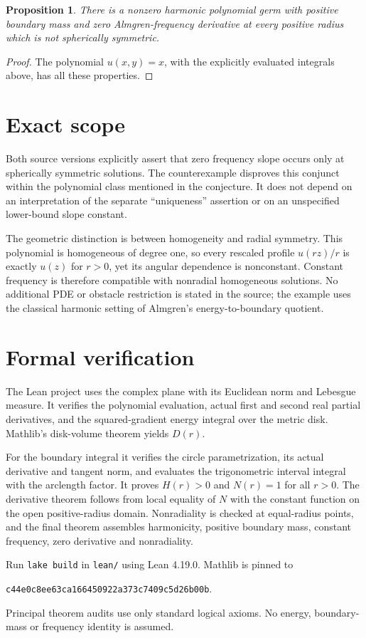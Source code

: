\documentclass[11pt]{article}
\newtheorem{proposition}{Proposition}
\begin{document}
\begin{proposition}
There is a nonzero harmonic polynomial germ with positive boundary mass and zero Almgren-frequency derivative at every positive radius which is not spherically symmetric.
\end{proposition}
\begin{proof}
The polynomial $u(x,y)=x$, with the explicitly evaluated integrals above, has all these properties.
\end{proof}

\section*{Exact scope}
Both source versions explicitly assert that zero frequency slope occurs only at spherically symmetric solutions. The counterexample disproves this conjunct within the polynomial class mentioned in the conjecture. It does not depend on an interpretation of the separate ``uniqueness'' assertion or on an unspecified lower-bound slope constant.

The geometric distinction is between homogeneity and radial symmetry. This polynomial is homogeneous of degree one, so every rescaled profile $u(rz)/r$ is exactly $u(z)$ for $r>0$, yet its angular dependence is nonconstant. Constant frequency is therefore compatible with nonradial homogeneous solutions. No additional PDE or obstacle restriction is stated in the source; the example uses the classical harmonic setting of Almgren's energy-to-boundary quotient.

\section*{Formal verification}
The Lean project uses the complex plane with its Euclidean norm and Lebesgue measure. It verifies the polynomial evaluation, actual first and second real partial derivatives, and the squared-gradient energy integral over the metric disk. Mathlib's disk-volume theorem yields $D(r)$.

For the boundary integral it verifies the circle parametrization, its actual derivative and tangent norm, and evaluates the trigonometric interval integral with the arclength factor. It proves $H(r)>0$ and $N(r)=1$ for all $r>0$. The derivative theorem follows from local equality of $N$ with the constant function on the open positive-radius domain. Nonradiality is checked at equal-radius points, and the final theorem assembles harmonicity, positive boundary mass, constant frequency, zero derivative and nonradiality.

Run \texttt{lake build} in \texttt{lean/} using Lean 4.19.0. Mathlib is pinned to
\begin{center}\small\texttt{c44e0c8ee63ca166450922a373c7409c5d26b00b}.\end{center}
Principal theorem audits use only standard logical axioms. No energy, boundary-mass or frequency identity is assumed.
\end{document}
